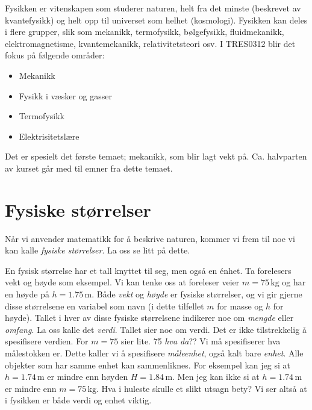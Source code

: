 Fysikken er vitenskapen som studerer naturen, helt fra det minste (beskrevet av kvantefysikk) og helt opp til universet som helhet (kosmologi). Fysikken kan deles i flere grupper, slik som mekanikk, termofysikk, bølgefysikk, fluidmekanikk, elektromagnetisme, kvantemekanikk, relativitetsteori osv. I TRES0312 blir det fokus på følgende områder:
\begin{itemize}
    \item Mekanikk
    \vspace{-0.75em}
    \item Fysikk i væsker og gasser
    \vspace{-0.75em}
    \item Termofysikk
    \vspace{-0.75em}
    \item Elektrisitetslære 
\end{itemize}
Det er spesielt det første temaet; mekanikk, som blir lagt vekt på. Ca. halvparten av kurset går med til emner fra dette temaet.

\section{Fysiske størrelser}
Når vi anvender matematikk for å beskrive naturen, kommer vi frem til noe vi kan kalle \textit{fysiske størrelser}. La oss se litt på dette.

En fysisk størrelse har et tall knyttet til seg, men også en énhet. Ta forelesers vekt og høyde som eksempel. Vi kan tenke oss at foreleser veier $m=75\,\textrm{kg}$ og har en høyde på $h=1.75\,\textrm{m}$. Både \textit{vekt} og \textit{høyde} er fysiske størrelser, og vi gir gjerne disse størrelsene en variabel som navn (i dette tilfellet $m$ for masse og $h$ for høyde). Tallet i hver av disse fysiske størrelsene indikerer noe om \textit{mengde} eller \textit{omfang}. La oss kalle det \textit{verdi}.  Tallet sier noe om verdi.
Det er ikke tilstrekkelig å spesifisere verdien. For $m=75$ sier lite. 75 \textit{hva da}?? Vi må spesifiserer hva målestokken er. Dette kaller vi å spesifisere \textit{måleenhet}, også kalt bare \textit{enhet}. Alle objekter som har samme enhet kan sammenliknes. For eksempel kan jeg si at $h=1.74\,\textrm{m}$ er mindre enn høyden $H=1.84\,\textrm{m}$. Men jeg kan ikke si at $h=1.74\,\textrm{m}$ er mindre enn $m=75\,\textrm{kg}$. Hva i huleste skulle et slikt utsagn bety? Vi ser altså at i fysikken er både verdi og enhet viktig.


